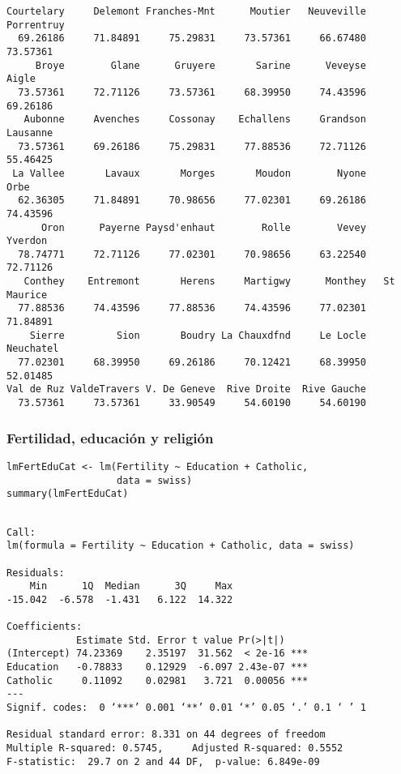 \documentclass{beamer}
\begin{document}
\begin{frame}[fragile]
\begin{verbatim}
Courtelary     Delemont Franches-Mnt      Moutier   Neuveville   Porrentruy 
  69.26186     71.84891     75.29831     73.57361     66.67480     73.57361 
     Broye        Glane      Gruyere       Sarine      Veveyse        Aigle 
  73.57361     72.71126     73.57361     68.39950     74.43596     69.26186 
   Aubonne     Avenches     Cossonay    Echallens     Grandson     Lausanne 
  73.57361     69.26186     75.29831     77.88536     72.71126     55.46425 
 La Vallee       Lavaux       Morges       Moudon        Nyone         Orbe 
  62.36305     71.84891     70.98656     77.02301     69.26186     74.43596 
      Oron      Payerne Paysd'enhaut        Rolle        Vevey      Yverdon 
  78.74771     72.71126     77.02301     70.98656     63.22540     72.71126 
   Conthey    Entremont       Herens     Martigwy      Monthey   St Maurice 
  77.88536     74.43596     77.88536     74.43596     77.02301     71.84891 
    Sierre         Sion       Boudry La Chauxdfnd     Le Locle    Neuchatel 
  77.02301     68.39950     69.26186     70.12421     68.39950     52.01485 
Val de Ruz ValdeTravers V. De Geneve  Rive Droite  Rive Gauche 
  73.57361     73.57361     33.90549     54.60190     54.60190
\end{verbatim}
\end{frame}
\begin{frame}[fragile]
\frametitle{Fertilidad, educación y religión}
\label{sec-3-3}


\lstset{language=R}
\begin{lstlisting}
lmFertEduCat <- lm(Fertility ~ Education + Catholic,
                   data = swiss)
summary(lmFertEduCat)
\end{lstlisting}


\begin{verbatim}

Call:
lm(formula = Fertility ~ Education + Catholic, data = swiss)

Residuals:
    Min      1Q  Median      3Q     Max 
-15.042  -6.578  -1.431   6.122  14.322 

Coefficients:
            Estimate Std. Error t value Pr(>|t|)    
(Intercept) 74.23369    2.35197  31.562  < 2e-16 ***
Education   -0.78833    0.12929  -6.097 2.43e-07 ***
Catholic     0.11092    0.02981   3.721  0.00056 ***
---
Signif. codes:  0 ‘***’ 0.001 ‘**’ 0.01 ‘*’ 0.05 ‘.’ 0.1 ‘ ’ 1 

Residual standard error: 8.331 on 44 degrees of freedom
Multiple R-squared: 0.5745,     Adjusted R-squared: 0.5552 
F-statistic:  29.7 on 2 and 44 DF,  p-value: 6.849e-09
\end{verbatim}
\end{frame}
\end{document}
